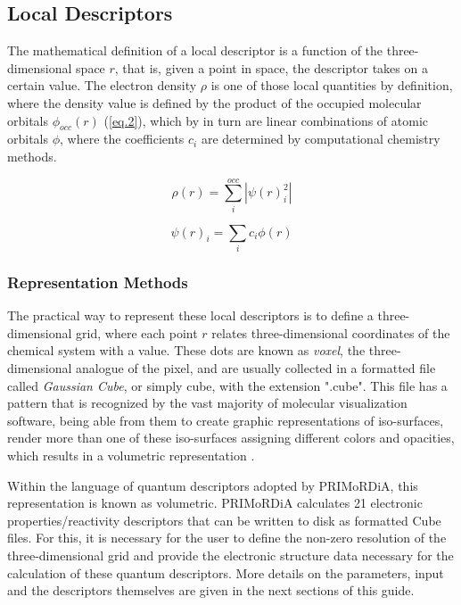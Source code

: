 \documentclass[a4paper,11pt]{refart}
\begin{document}
	\subsection{Local Descriptors}

	The mathematical definition of a local descriptor is a function of the three-dimensional space $r$, that is, given a point in space, the descriptor takes on a certain value. The electron density $\rho$ is one of those local quantities by definition, where the density value is defined by the product of the occupied molecular orbitals $\phi_{occ}(r)$ (\autoref{eq.2}), which by in turn are linear combinations of atomic orbitals $\phi $, where the coefficients $c_i$ are determined by computational chemistry methods.

	\begin{equation}
	\rho(r) = \sum_{i}^{occ} |\psi(r)^2_i|
	\label{eq.2} 
	\end{equation}

	\begin{equation}
	\psi(r)_i = \sum_{i} c_i \phi(r)
	\label{eq.3} 
	\end{equation}

	\subsubsection{Representation Methods}

	The practical way to represent these local descriptors is to define a three-dimensional grid, where each point $r$ relates three-dimensional coordinates of the chemical system with a value. These dots are known as \textit{voxel}, the three-dimensional analogue of the pixel, and are usually collected in a formatted file called \textit{Gaussian Cube}, or simply cube, with the extension ".cube". This file has a pattern that is recognized by the vast majority of molecular visualization software, being able from them to create graphic representations of iso-surfaces, render more than one of these iso-surfaces assigning different colors and opacities, which results in a volumetric representation .

	Within the language of quantum descriptors adopted by PRIMoRDiA, this representation is known as volumetric. PRIMoRDiA calculates 21 electronic properties/reactivity descriptors that can be written to disk as formatted Cube files. For this, it is necessary for the user to define the non-zero resolution of the three-dimensional grid and provide the electronic structure data necessary for the calculation of these quantum descriptors. More details on the parameters, input and the descriptors themselves are given in the next sections of this guide.
\end{document}
